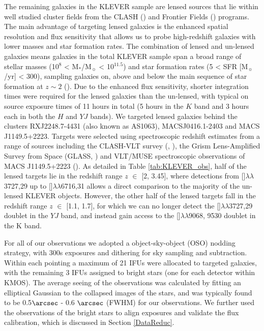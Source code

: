 \documentclass[usenatbib]{mnras} %
\begin{document}
The remaining galaxies in the KLEVER sample are lensed sources that lie within well studied cluster fields from the CLASH (\citealt{Postman_2012}) and Frontier Fields (\citealt{Lotz_2017}) programs. The main advantage of targeting lensed galaxies is the enhanced spatial resolution and flux sensitivity that allows us to probe high-redshift galaxies with lower masses and star formation rates. The combination of lensed and un-lensed galaxies means galaxies in the total KLEVER sample span a broad range of stellar masses (10$^8$ < M$_*$/M$_{\sun}$ < 10$^{11.5}$) and star formation rates (5 < SFR [M$_{\sun}$/yr] < 300), sampling galaxies on, above and below the main sequence of star formation at $z\sim2$ (\citealt{Noeske_2007}). Due to the enhanced flux sensitivity, shorter integration times were required for the lensed galaxies than the un-lensed, with typical on source exposure times of 11 hours in total (5 hours in the $K$ band and 3 hours each in both the $H$ and $YJ$ bands). We targeted lensed galaxies behind the clusters RXJ2248.7-4431 (also known as AS1063), MACSJ0416.1-2403 and MACS J1149.5+2223. Targets were selected using spectroscopic redshift estimates from a range of sources including the CLASH-VLT survey (\citealt{Rosati_2014}, \citealt{Balestra_2016}), the Grism Lens-Amplified Survey from Space (GLASS, \citealt{Treu_2015}) and VLT/MUSE spectroscopic observations of MACS J1149.5+2223 (\citealt{Grillo_2016}). As detailed in Table \ref{tab:KLEVER_obs}, half of the lensed targets lie in the redshift range $z$ $\in$ [2, 3.45], where detections from []$\lambda\lambda$3727,29 up to  []$\lambda\lambda$6716,31 allows a direct comparison to the majority of the un-lensed KLEVER objects. However, the other half of the lensed targets fall in the redshift range $z$ $\in$ [1.1, 1.7], for which we can no longer detect the []$\lambda\lambda$3727,29 doublet in the $YJ$ band, and instead gain access to the []$\lambda\lambda$9068, 9530 doublet in the K band. 


For all of our observations we adopted a object-sky-object (OSO) nodding strategy, with 300s exposures and dithering for sky sampling and subtraction. Within each pointing a maximum of 21 IFUs were allocated to targeted galaxies, with the remaining 3 IFUs assigned to bright stars (one for each detector within KMOS). The average seeing of the observations was calculated by fitting an elliptical Gaussian to the collapsed images of the stars, and was typically found to be 0.5$\arcsec$ - 0.6 $\arcsec$ (FWHM) for our observations. We further used the observations of the bright stars to align exposures and validate the flux calibration, which is discussed in Section \ref{DataReduc}.
\end{document}

